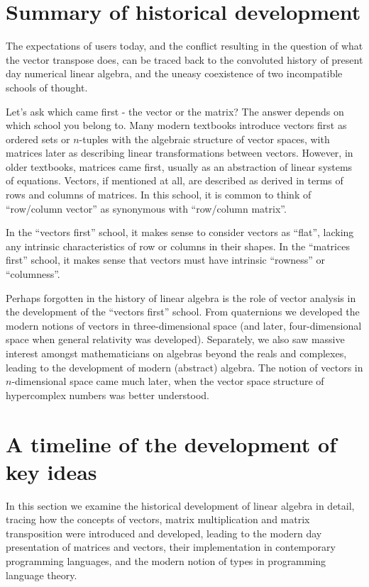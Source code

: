 \section{Summary of historical development}

The expectations of users today, and the conflict resulting in the question
of what the vector transpose does, can be traced back to the convoluted history
of present day numerical linear algebra, and the uneasy coexistence of two
incompatible schools of thought.

Let's ask which came first - the vector or the matrix? The answer depends on
which school you belong to. Many modern textbooks  introduce
vectors first as ordered sets or $n$-tuples with the algebraic structure of
vector spaces, with matrices later as describing linear transformations between
vectors.
However, in older textbooks, matrices came first, usually as an abstraction of
linear systems of equations. Vectors, if mentioned at all, are described as
derived in terms of rows and columns of matrices. In this school, it is common
to think of ``row/column vector'' as synonymous with ``row/column matrix''.

In the ``vectors first'' school, it makes sense to consider vectors as ``flat'',
lacking any intrinsic characteristics of row or columns in their shapes.
In the ``matrices first'' school, it makes sense that vectors must have intrinsic
``rowness'' or ``columness''.

Perhaps forgotten in the history of linear algebra is the role of vector analysis
in the development of the ``vectors first'' school. From quaternions we developed
the modern notions of vectors in three-dimensional space (and later, four-dimensional
space when general relativity was developed). Separately, we also saw massive
interest amongst mathematicians on algebras beyond the reals and complexes,
leading to the development of modern (abstract) algebra. The notion of vectors
in $n$-dimensional space came much later, when the vector space structure of
hypercomplex numbers was better understood.



\section{A timeline of the development of key ideas}

In this section we examine the historical development of linear algebra in
detail, tracing how the concepts of vectors, matrix multiplication and
matrix transposition were introduced and developed, leading to the modern day
presentation of matrices and vectors, their implementation in contemporary
programming languages, and the modern notion of types in programming language
theory.

